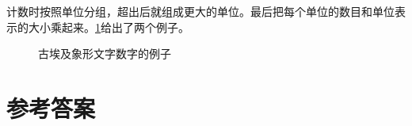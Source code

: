 \documentclass[b5paper]{ctexart}
\begin{document}
计数时按照单位分组，超出后就组成更大的单位。最后把每个单位的数目和单位表示的大小乘起来。\cref{fig:egypt-number-examples}给出了两个例子。

\begin{figure}[htbp]
 \centering
 \caption{古埃及象形文字数字的例子}
 \label{fig:egypt-number-examples}
\end{figure}



\ifx\wholebook\relax \else
\section{参考答案}
\shipoutAnswer

\begin{thebibliography}{99}




\end{thebibliography}

\expandafter\enddocument

\fi
\end{document}
